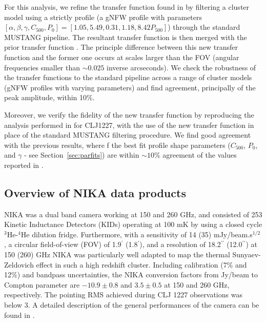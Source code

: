 \documentclass[twocolumn,traditabstract]{aa}
\begin{document}
For this analysis, we refine the transfer function found in  \citet{romero2017} by filtering a cluster model
using a strictly  profile (a gNFW profile with parameters
$[\alpha,\beta,\gamma,C_{500},P_0]=[1.05,5.49,0.31,1.18,8.42 P_{500}]$) through the standard MUSTANG pipeline.
The resultant transfer function is then merged with the prior transfer function \citep[on white noise][]{romero2017}.
The principle difference between this new transfer function and the former one
occurs at scales larger than the FOV (angular frequencies smaller than $\sim0.025$ inverse arcseconds).
We check the robustness of the transfer functions to the standard pipeline across a range of cluster models
(gNFW profiles with varying parameters) and find agreement, principally of the peak amplitude, within 10\%.

Moreover, we verify the fidelity of the new transfer function by reproducing the analysis performed in
\citet{romero2017} for CLJ1227, with the use of the new transfer function in place of the standard MUSTANG
filtering procedure. We find good agreement with the previous results, where
f%
the best fit profile shape parameters ($C_{500}$, $P_0$, and $\gamma$ - see Section~\ref{sec:parfits})
are within $\sim10$\% agreement of the values reported in \citet{romero2017}.

\subsection{Overview of NIKA data products}
\label{sec:nikaobs}
NIKA \citep{monfardini2010,monfardini2014} was a dual band camera working at 150 and
260 GHz, and consisted of 253 Kinetic Inductance Detectors (KIDs) operating at 100 mK by using a closed cycle $^3$He-$^4$He dilution fridge. 
Furthermore, with a sensitivity of 14 (35) mJy/beam.s$^{1/2}$ , a circular field-of-view (FOV) of 1.9$^{\prime}$ (1.8$^{\prime}$), and a
resolution of 18.2$^{\prime \prime}$ (12.0$^{\prime \prime}$) at 150 (260) GHz NIKA was particularly well adapted to map the thermal
Sunyaev-Zeldovich effect in such a high redshift cluster. Including calibration (7\% and 12\%) and bandpass uncertainties, the NIKA conversion
factors from Jy/beam to Compton parameter are $-10.9 \pm 0.8$ and $3.5\pm0.5$ at 150 and 260 GHz, respectively. The pointing RMS
achieved during CLJ 1227 observations was below 3\asec.
A detailed description of the general performances of the camera can be found in \citet{catalano2014,adam2014}.
\end{document}
